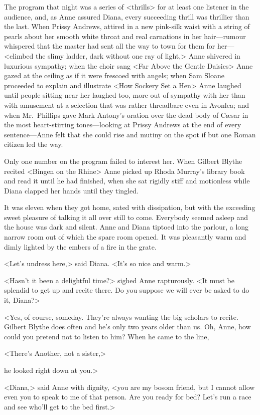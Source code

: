 The program that night was a series of <thrills> for at least one listener in the audience, and, as Anne assured Diana, every succeeding thrill was thrillier than the last. When Prissy Andrews, attired in a new pink-silk waist with a string of pearls about her smooth white throat and real carnations in her hair—rumour whispered that the master had sent all the way to town for them for her—<climbed the slimy ladder, dark without one ray of light,> Anne shivered in luxurious sympathy; when the choir sang <Far Above the Gentle Daisies> Anne gazed at the ceiling as if it were frescoed with angels; when Sam Sloane proceeded to explain and illustrate <How Sockery Set a Hen> Anne laughed until people sitting near her laughed too, more out of sympathy with her than with amusement at a selection that was rather threadbare even in Avonlea; and when Mr.~Phillips gave Mark Antony's oration over the dead body of Cæsar in the most heart-stirring tones—looking at Prissy Andrews at the end of every sentence—Anne felt that she could rise and mutiny on the spot if but one Roman citizen led the way.

Only one number on the program failed to interest her. When Gilbert Blythe recited <Bingen on the Rhine> Anne picked up Rhoda Murray's library book and read it until he had finished, when she sat rigidly stiff and motionless while Diana clapped her hands until they tingled.

It was eleven when they got home, sated with dissipation, but with the exceeding sweet pleasure of talking it all over still to come. Everybody seemed asleep and the house was dark and silent. Anne and Diana tiptoed into the parlour, a long narrow room out of which the spare room opened. It was pleasantly warm and dimly lighted by the embers of a fire in the grate.

<Let's undress here,> said Diana. <It's so nice and warm.>

<Hasn't it been a delightful time?> sighed Anne rapturously. <It must be splendid to get up and recite there. Do you suppose we will ever be asked to do it, Diana?>

<Yes, of course, someday. They're always wanting the big scholars to recite. Gilbert Blythe does often and he's only two years older than us. Oh, Anne, how could you pretend not to listen to him? When he came to the line,

<There's Another, not a sister,>

he looked right down at you.>

<Diana,> said Anne with dignity, <you are my bosom friend, but I cannot allow even you to speak to me of that person. Are you ready for bed? Let's run a race and see who'll get to the bed first.>


